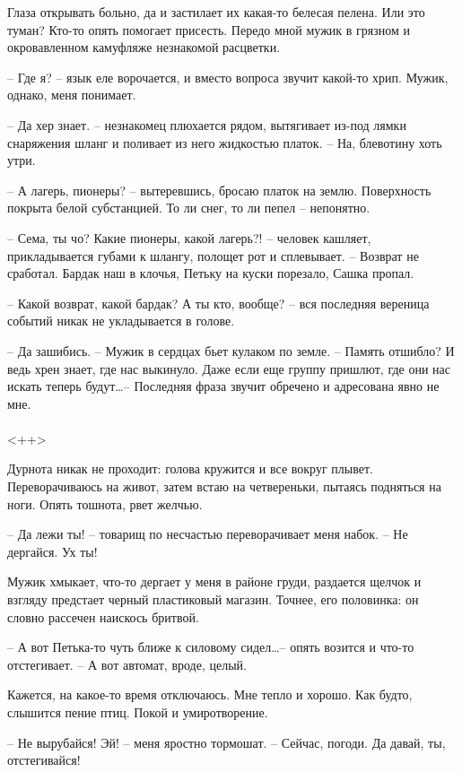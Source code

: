 \documentclass[a4paper]{book}
\begin{document}
Глаза открывать больно, да и застилает их какая-то белесая пелена. Или это туман? Кто-то опять помогает присесть. Передо мной мужик в грязном и окровавленном камуфляже незнакомой расцветки. 

-- Где я? -- язык еле ворочается, и вместо вопроса звучит какой-то хрип. Мужик, однако, меня понимает. 

-- Да хер знает. -- незнакомец плюхается рядом, вытягивает из-под лямки снаряжения шланг и поливает из него жидкостью платок. -- На, блевотину хоть утри.

-- А лагерь, пионеры? -- вытеревшись, бросаю платок на землю. Поверхность покрыта белой субстанцией. То ли снег, то ли пепел -- непонятно.

-- Сема, ты чо? Какие пионеры, какой лагерь?! -- человек кашляет, прикладывается губами к шлангу,  полощет рот и сплевывает. -- Возврат не сработал. Бардак наш в клочья, Петьку на куски порезало, Сашка пропал.

-- Какой возврат, какой бардак? А ты кто, вообще? -- вся последняя вереница событий никак не укладывается в голове.

-- Да зашибись. -- Мужик в сердцах бьет кулаком по земле. -- Память отшибло? И ведь хрен знает, где нас выкинуло. Даже если еще группу пришлют, где они нас искать теперь будут\ldots -- Последняя фраза звучит обречено и адресована явно не мне.  

\paragraph{}<++>

Дурнота никак не проходит: голова кружится и все вокруг плывет. Переворачиваюсь на живот, затем встаю на четвереньки, пытаясь подняться на ноги. Опять тошнота, рвет желчью.

-- Да лежи ты! -- товарищ по несчастью переворачивает меня набок. -- Не дергайся. Ух ты! 

Мужик хмыкает, что-то дергает у меня в районе груди, раздается щелчок и взгляду предстает черный пластиковый магазин. Точнее, его половинка: он словно рассечен наискось бритвой. 

-- А вот Петька-то чуть ближе к силовому сидел\ldots -- опять возится и что-то отстегивает. -- А вот автомат, вроде, целый. 

Кажется, на какое-то время отключаюсь. Мне тепло и хорошо. Как будто, слышится пение птиц. Покой и умиротворение. 

-- Не вырубайся! Эй! -- меня яростно тормошат. -- Сейчас, погоди. Да давай, ты, отстегивайся! 
\end{document}
